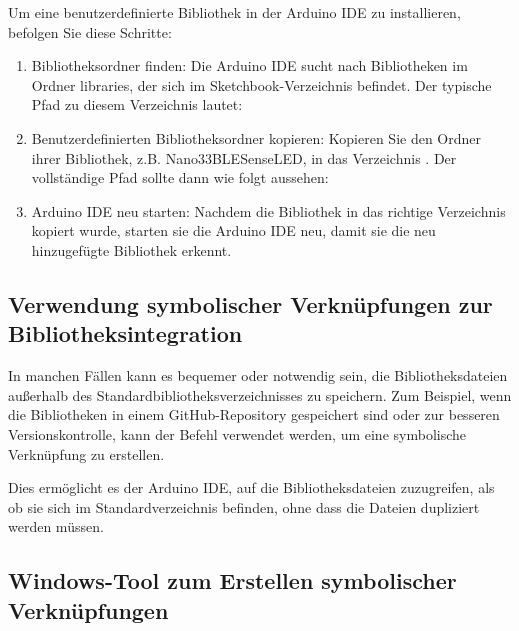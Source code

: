 Um eine benutzerdefinierte Bibliothek in der Arduino IDE zu installieren, befolgen Sie diese Schritte: 

\begin{enumerate}
	\item Bibliotheksordner finden: 
	Die Arduino IDE sucht nach Bibliotheken im Ordner libraries, der sich im Sketchbook-Verzeichnis befindet. 
	Der typische Pfad zu diesem Verzeichnis lautet: 
	
	\medskip
	
	{\small{}}
	
	\item Benutzerdefinierten Bibliotheksordner kopieren: 
	Kopieren Sie den Ordner ihrer Bibliothek, z.B. Nano33BLESenseLED, in das Verzeichnis . 
	Der vollständige Pfad sollte dann wie folgt aussehen: 
	
	\medskip
	
	{\small{}}
	
	\item Arduino IDE neu starten: 
	Nachdem die Bibliothek in das richtige Verzeichnis kopiert wurde, starten sie die Arduino IDE neu, 
	damit sie die neu hinzugefügte Bibliothek erkennt. 
	
\end{enumerate}

\subsection{Verwendung symbolischer Verknüpfungen zur Bibliotheksintegration}

In manchen Fällen kann es bequemer oder notwendig sein, die Bibliotheksdateien au\ss erhalb des Standardbibliotheksverzeichnisses zu speichern. 
Zum Beispiel, wenn die Bibliotheken in einem GitHub-Repository gespeichert sind oder zur besseren Versionskontrolle, kann der Befehl  verwendet werden, um eine symbolische Verknüpfung zu erstellen. 

Dies ermöglicht es der Arduino IDE, auf die Bibliotheksdateien zuzugreifen, als ob sie sich im Standardverzeichnis befinden, ohne dass die Dateien dupliziert werden müssen. 


\subsection{Windows-Tool  zum Erstellen symbolischer Verknüpfungen}

